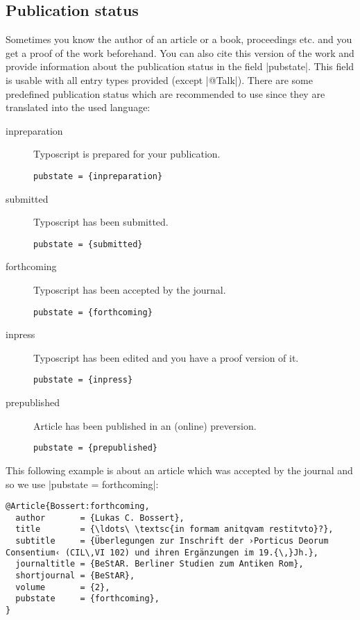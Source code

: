 \documentclass[a4paper,
10pt,
greek,
french,
spanish,
italian,
ngerman,
english
]{ltxdoc}
\begin{document}
\subsection{Publication status}
Sometimes you know the author of an article or a book, proceedings etc. and you get a proof of the work beforehand.
You can also cite this version of the work and provide information about the publication status in the field |pubstate|.
This field is usable with all entry types provided (except |@Talk|).
There are some predefined publication status which are recommended to use since they are translated into the used language:
\begin{description}
\item[inpreparation] Typoscript is prepared for your publication. 
\begin{lstlisting}
pubstate = {inpreparation}
\end{lstlisting}
\item[submitted] Typoscript has been submitted.

\begin{lstlisting}
pubstate = {submitted}
\end{lstlisting}

\item[forthcoming] Typoscript has been accepted by the journal.

\begin{lstlisting}
pubstate = {forthcoming}
\end{lstlisting}

\item[inpress] Typoscript has been edited and you have a proof version of it.

\begin{lstlisting}
pubstate = {inpress}
\end{lstlisting}

\item[prepublished] Article has been published in an (online) preversion.

\begin{lstlisting}
pubstate = {prepublished}
\end{lstlisting}

\end{description}
This following example is about an article which was accepted by the journal and so we use |pubstate = {forthcoming}|:
\begin{lstlisting}[style=bibentry,label=Bossert:forthcoming,caption={{@}Article\{Bossert:forthcoming,…\} }]
@Article{Bossert:forthcoming,
  author       = {Lukas C. Bossert},
  title        = {\ldots\ \textsc{in formam anitqvam restitvto}?},
  subtitle     = {Überlegungen zur Inschrift der ›Porticus Deorum Consentium‹ (CIL\,VI 102) und ihren Ergänzungen im 19.{\,}Jh.},
  journaltitle = {BeStAR. Berliner Studien zum Antiken Rom},
  shortjournal = {BeStAR},
  volume       = {2},
  pubstate     = {forthcoming},
}
\end{lstlisting}
\end{document}

